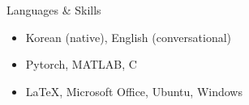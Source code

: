 \begin{rSection}{Languages \& Skills}
  \begin{itemize}
  \item Korean (native), English (conversational)
  \item Pytorch, MATLAB, C
  \item \LaTeX, Microsoft Office, Ubuntu, Windows
  \end{itemize}
\end{rSection}
